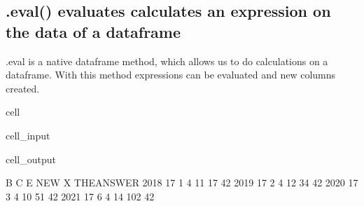\documentclass[letterpaper,10pt,english]{jupyterBook}
\begin{document}
\subsection{.eval() evaluates calculates an expression on the data of a dataframe}
\label{\detokenize{content/04_PythonEssentials/PythonPackagesEtc:eval-evaluates-calculates-an-expression-on-the-data-of-a-dataframe}}
\sphinxAtStartPar
.eval is a native dataframe method, which allows us to do calculations on a dataframe. With this method expressions can be evaluated and new columns created.

\begin{sphinxuseclass}{cell}\begin{sphinxVerbatimInput}

\begin{sphinxuseclass}{cell_input}
\begin{sphinxVerbatim}[commandchars=\\\{\}]
\end{sphinxVerbatim}

\end{sphinxuseclass}\end{sphinxVerbatimInput}
\begin{sphinxVerbatimOutput}

\begin{sphinxuseclass}{cell_output}
\begin{sphinxVerbatim}[commandchars=\\\{\}]
       B  C  E  NEW    X  THE\PYGZus{}ANSWER
2018  17  1  4   11   17          42
2019  17  2  4   12   34          42
2020  17  3  4   10   51          42
2021  17  6  4   14  102          42
\end{sphinxVerbatim}

\end{sphinxuseclass}\end{sphinxVerbatimOutput}

\end{sphinxuseclass}
\end{document}
